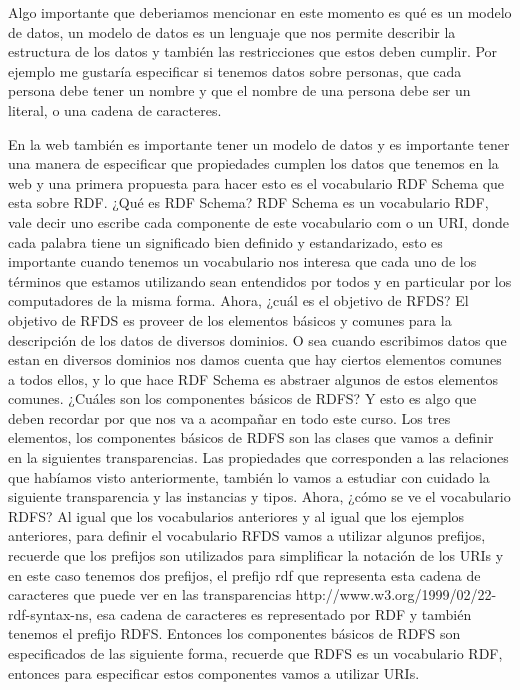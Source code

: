 Algo importante que deberiamos mencionar en este momento es qué es un modelo de datos, un modelo de datos es un lenguaje que nos permite describir la estructura de los datos y también las restricciones que estos deben cumplir. Por ejemplo me gustaría especificar si tenemos datos sobre personas, que cada persona debe tener un nombre y que el nombre de una persona debe ser un literal, o una cadena de caracteres.

En la web también es importante tener un modelo de datos y es importante tener una manera de especificar que propiedades cumplen los datos que tenemos en la web y una primera propuesta para hacer esto es el vocabulario RDF Schema que esta sobre RDF. ¿Qué es RDF Schema? RDF Schema es un vocabulario RDF, vale decir uno escribe cada componente de este vocabulario com o un URI, donde cada palabra tiene un significado bien definido y estandarizado, esto es importante cuando tenemos un vocabulario nos interesa que cada uno de los términos que estamos utilizando sean entendidos por todos y en particular por los computadores de la misma forma. Ahora, ¿cuál es el objetivo de RFDS? El objetivo de RFDS es proveer de los elementos básicos y comunes para la descripción de los datos de diversos dominios. O sea cuando escribimos datos que estan en diversos dominios nos damos cuenta que hay ciertos elementos comunes a todos ellos, y lo que hace RDF Schema es abstraer algunos de estos elementos comunes. ¿Cuáles son los componentes básicos de RDFS? Y esto es algo que deben recordar por que nos va a acompañar en todo este curso. Los tres elementos, los componentes básicos de RDFS son las clases que vamos a definir en la siguientes transparencias. Las propiedades que corresponden a las relaciones que habíamos visto anteriormente, también lo vamos a estudiar con cuidado la siguiente transparencia y las instancias y tipos. Ahora, ¿cómo se ve el vocabulario RDFS? Al igual que los vocabularios anteriores y al igual que los ejemplos anteriores, para definir el vocabulario RFDS vamos a utilizar algunos prefijos, recuerde que los prefijos son utilizados para simplificar la notación de los URIs y en este caso tenemos dos prefijos, el prefijo rdf que representa esta cadena de caracteres que puede ver en las transparencias http://www.w3.org/1999/02/22- rdf-syntax-ns, esa cadena de caracteres es representado por RDF y también tenemos el prefijo RDFS. Entonces los componentes básicos de RDFS son especificados de las siguiente forma, recuerde que RDFS es un vocabulario RDF, entonces para especificar estos componentes vamos a utilizar URIs.

